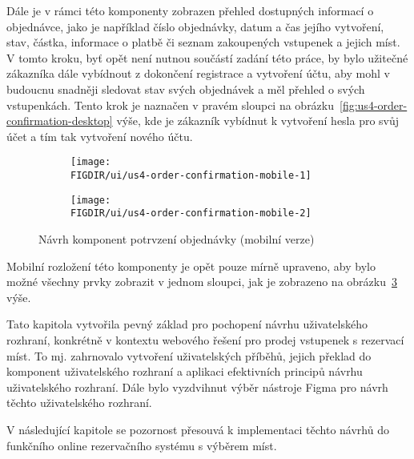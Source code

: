 Dále je v rámci této komponenty zobrazen přehled dostupných informací o objednávce, jako je například číslo objednávky, datum a čas jejího vytvoření, stav, částka, informace o platbě či seznam zakoupených vstupenek a jejich míst.
V tomto kroku, byť opět není nutnou součástí zadání této práce, by bylo užitečné zákazníka dále vybídnout z dokončení registrace a vytvoření účtu, aby mohl v budoucnu snadněji sledovat stav svých objednávek a měl přehled o svých vstupenkách.
Tento krok je naznačen v pravém sloupci na obrázku~\ref{fig:us4-order-confirmation-desktop} výše, kde je zákazník vybídnut k vytvoření hesla pro svůj účet a tím tak vytvoření nového účtu.

\begin{figure}[H]
    \centering
    \begin{subfigure}{0.4\textwidth}
        \texttt{[image: \\FIGDIR/ui/us4-order-confirmation-mobile-1]}
        \label{fig:us4-order-confirmation-mobile-1}
    \end{subfigure}
    \hfill
    \begin{subfigure}{0.4\textwidth}
        \texttt{[image: \\FIGDIR/ui/us4-order-confirmation-mobile-2]}
        \label{fig:us4-order-confirmation-mobile-2}
    \end{subfigure}

    \caption{Návrh komponent potrvzení objednávky (mobilní verze)}
    \label{fig:us4-order-confirmation-mobile}
\end{figure}

Mobilní rozložení této komponenty je opět pouze mírně upraveno, aby bylo možné všechny prvky zobrazit v jednom sloupci, jak je zobrazeno na obrázku~\ref{fig:us4-order-confirmation-mobile} výše.

Tato kapitola vytvořila pevný základ pro pochopení návrhu uživatelského rozhraní, konkrétně v kontextu webového řešení pro prodej vstupenek s rezervací míst.
To mj. zahrnovalo vytvoření uživatelských příběhů, jejich překlad do komponent uživatelského rozhraní a aplikaci efektivních principů návrhu uživatelského rozhraní.
Dále bylo vyzdvihnut výběr nástroje Figma pro návrh těchto uživatelského rozhraní.

V následující kapitole se pozornost přesouvá k implementaci těchto návrhů do funkčního online rezervačního systému s výběrem míst.
